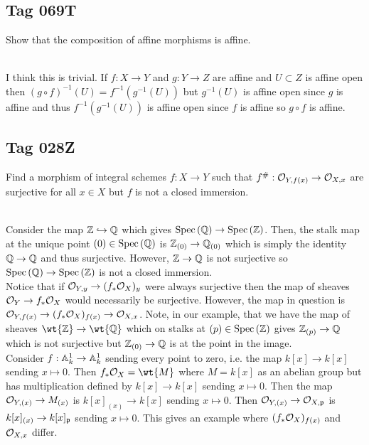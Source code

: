 \documentclass[12pt]{article}
\begin{document}
\subsection{Tag 069T}

\begin{exr}
Show that the composition of affine morphisms is affine.
\end{exr}
\noindent\\
I think this is trivial. If $f : X \to Y$ and $g : Y \to Z$ are affine and $U \subset Z$ is affine open then $(g \circ f)^{-1}(U) = f^{-1}(g^{-1}(U))$ but $g^{-1}(U)$ is affine open since $g$ is affine and thus $f^{-1}(g^{-1}(U))$ is affine open since $f$ is affine so $g \circ f$ is affine. 

\subsection{Tag 028Z}

\begin{exr}
Find a morphism of integral schemes $f : X \to Y$ such that $f^\# : \mathcal{O}_{Y, f(x)} \to \mathcal{O}_{X, x}$ are surjective for all $x \in X$ but $f$ is not a closed immersion. 
\end{exr}
\noindent\\
Consider the map $\mathbb{Z} \hookrightarrow \mathbb{Q}$ which gives $\mathrm{Spec}\left( \mathbb{Q} \right) \to \mathrm{Spec}\left( \mathbb{Z} \right)$. Then, the stalk map at the unique point $(0) \in \mathrm{Spec}\left( \mathbb{Q} \right)$ is $\mathbb{Z}_{(0)} \to \mathbb{Q}_{(0)}$ which is simply the identity $\mathbb{Q} \to \mathbb{Q}$ and thus surjective. However, $\mathbb{Z} \to \mathbb{Q}$ is not surjective so $\mathrm{Spec}\left( \mathbb{Q} \right) \to \mathrm{Spec}\left( \mathbb{Z} \right)$ is not a closed immersion. 
\bigskip\\
Notice that if $\mathcal{O}_{Y, y} \to (f_* \mathcal{O}_{X})_{y}$ were always surjective then the map of sheaves $\mathcal{O}_{Y} \to f_* \mathcal{O}_{X}$ would necessarily be surjective. However, the map in question is $\mathcal{O}_{Y, f(x)} \to (f_* \mathcal{O}_{X})_{f(x)} \to \mathcal{O}_{X, x}$. Note, in our example, that we have the map of sheaves $\wt{\Z} \to \wt{\Q}$ which on stalks at $(p) \in \mathrm{Spec}\left( \mathbb{Z} \right)$ gives $\mathbb{Z}_{(p)} \to \mathbb{Q}$ which is not surjective but $\mathbb{Z}_{(0)} \to \mathbb{Q}$ is at the point in the image.
\bigskip\\
Consider $f : \mathbb{A}^1_k \to \mathbb{A}^1_k$ sending every point to zero, i.e. the map $k[x] \to k[x]$ sending $x \mapsto 0$. Then $f_* \struct{X} = \wt{M}$ where $M = k[x]$ as an abelian group but has multiplication defined by $k[x] \to  k[x]$ sending $x \mapsto 0$. Then the map $\mathcal{O}_{Y, (x)} \to M_{(x)}$ is $k[x]_{(x)} \to k[x]$ sending $x \mapsto 0$. Then $\mathcal{O}_{Y, (x)} \to \mathcal{O}_{X, \mathfrak{p}}$ is $k[x]_{(x)} \to k[x]_{\mathfrak{p}}$ sending $x \mapsto 0$. This gives an example where $(f_* \mathcal{O}_{X})_{f(x)}$ and $\mathcal{O}_{X, x}$ differ.
\end{document}
